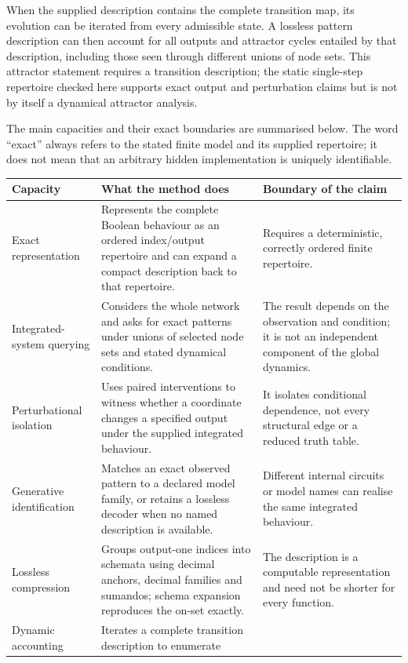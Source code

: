 \documentclass[11pt,a4paper]{article}
\begin{document}
When the supplied description contains the complete transition map, its
evolution can be iterated from every admissible state. A lossless pattern
description can then account for all outputs and attractor cycles entailed by
that description, including those seen through different unions of node sets.
This attractor statement requires a transition description; the static
single-step repertoire checked here supports exact output and perturbation
claims but is not by itself a dynamical attractor analysis.

The main capacities and their exact boundaries are summarised below. The
word ``exact'' always refers to the stated finite model and its supplied
repertoire; it does not mean that an arbitrary hidden implementation is
uniquely identifiable.

\begin{table}[htbp]
\centering
\small
\begin{tabularx}{\linewidth}{lXX}
\toprule
\textbf{Capacity} & \textbf{What the method does} & \textbf{Boundary of the claim}\\
\midrule
Exact representation & Represents the complete Boolean behaviour as an
ordered index/output repertoire and can expand a compact description back to
that repertoire. & Requires a deterministic, correctly ordered finite
repertoire.\\
Integrated-system querying & Considers the whole network and asks for exact
patterns under unions of selected node sets and stated dynamical conditions. &
The result depends on the observation and condition; it is not an independent
component of the global dynamics.\\
Perturbational isolation & Uses paired interventions to witness whether a
coordinate changes a specified output under the supplied integrated behaviour. &
It isolates conditional dependence, not every structural edge or a reduced
truth table.\\
Generative identification & Matches an exact observed pattern to a declared
model family, or retains a lossless decoder when no named description is
available. & Different internal circuits or model names can realise the same
integrated behaviour.\\
Lossless compression & Groups output-one indices into schemata using decimal
anchors, decimal families and sumandos; schema expansion reproduces the
on-set exactly. & The description is a computable representation and need not
be shorter for every function.\\
Dynamic accounting & Iterates a complete transition description to enumerate

\end{tabularx}
\end{table}
\end{document}

